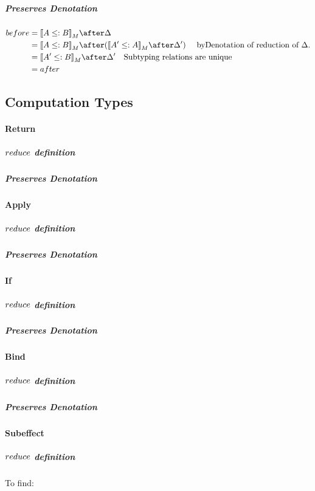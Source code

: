 {            \subparagraph{Preserves Denotation}
                \begin{align}
                    before & = \deno{A \subtype B} \after \D \\
                    & = \deno{A \subtype B} \after (\deno{A' \subtype A} \after \D') \quad\text{ byDenotation of reduction of $\D$.}\\
                    & = \deno{A' \subtype B} \after \D'\quad\text{Subtyping relations are unique} \\
                    & = after \\
                \end{align}
        \subsection{Computation Types}
            \paragraph{Return}
            \subparagraph{$reduce$ definition}
            \subparagraph{Preserves Denotation}
            \paragraph{Apply}
            \subparagraph{$reduce$ definition}
            \subparagraph{Preserves Denotation}
            \paragraph{If}
            \subparagraph{$reduce$ definition}
            \subparagraph{Preserves Denotation}
            \paragraph{Bind}
            \subparagraph{$reduce$ definition}
            \subparagraph{Preserves Denotation}
            \paragraph{Subeffect}
            \subparagraph{$reduce$ definition}
            To find:

}
